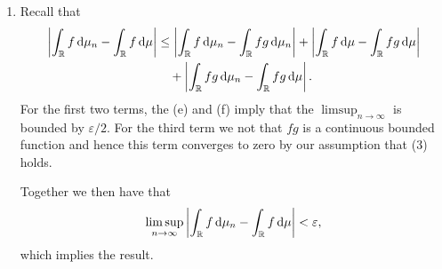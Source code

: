 \begin{enumerate}[label={(\alph*)}]
Now observe that the integral in the last term converges to $\int_\bbR g \, \dd \mu$ by (3). Thus, we obtain
\begin{align*}
	\limsup_{n \to \infty} \left|\int_\bbR f \, \dd \mu_n - \int_\bbR fg \, \dd \mu_n\right|
	&\le M \int_\bbR (1-g) \, \dd \mu \le M \mu(\bbR \backslash [-\alpha,\alpha]) < \frac{\varepsilon}{2}.
\end{align*}
\item 
Recall that
\begin{align*}
	\left|\int_{\mathbb R} f \, \mathrm{d} \mu_n - \int_{\mathbb R} f \, \mathrm{d} \mu\right| &\le \left|\int_{\mathbb R} f \, \mathrm{d} \mu_n - \int_{\mathbb R} fg \, \mathrm{d} \mu_n\right| + \left|\int_{\mathbb R} f \, \mathrm{d} \mu - \int_{\mathbb R} fg \, \mathrm{d} \mu\right|\\ &\hspace{10pt}+ \left|\int_{\mathbb R} fg \, \mathrm{d} \mu_n - \int_{\mathbb R} fg \, \mathrm{d} \mu\right|.
\end{align*}
For the first two terms, the (e) and (f) imply that the $\limsup_{n \to \infty}$ is bounded by $\varepsilon/2$. For the third term we not that $fg$ is a continuous bounded function and hence this term converges to zero by our assumption that (3) holds.

Together we then have that
\[
	\limsup_{n \to \infty} \left|\int_{\mathbb R} f \, \mathrm{d} \mu_n - \int_{\mathbb R} f \, \mathrm{d} \mu\right| < \varepsilon,
\]
which implies the result.
\end{enumerate}